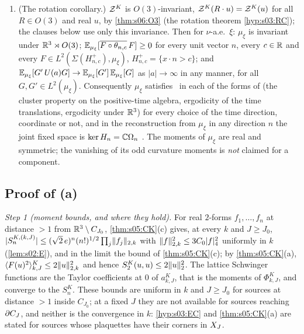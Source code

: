 \begin{theorem}
\begin{enumerate}[label=\textup{(\alph*)},leftmargin=*]
\item \textup{(The rotation corollary.)} $\mathcal Z^K$ is $O(3)$-invariant, $\mathcal Z^K(R\cdot u)=\mathcal Z^K(u)$ for all $R\in O(3)$ and real $u$, by \cref{thm:s06:O3} (the rotation theorem \cref{hyp:s03:RC}); the clauses below use only this invariance. Then for $\nu$-a.e.\ $\xi$: $\mu_\xi$ is invariant under $\mathbb R^3\rtimes O(3)$; $\mathbb E_{\mu_\xi}[\overline{F\circ\theta_{n,c}}\,F]\ge0$ for every unit vector $n$, every $c\in\mathbb R$ and every $F\in L^2(\Sigma(H^+_{n,c}),\mu_\xi)$, $H^+_{n,c}=\{x\cdot n>c\}$; and $\mathbb E_{\mu_\xi}[G'\,U(a)G]\to\mathbb E_{\mu_\xi}[G']\,\mathbb E_{\mu_\xi}[G]$ as $|a|\to\infty$ in any manner, for all $G,G'\in L^2(\mu_\xi)$. Consequently $\mu_\xi$ satisfies \OSf\ in each of the forms of \cite[Def.~2.11, Def.~2.12]{SymPhase} (the cluster property on the positive-time algebra, ergodicity of the time translations, ergodicity under $\mathbb R^3$) for every choice of the time direction, coordinate or not, and in the reconstruction from $\mu_\xi$ in any direction $n$ the joint fixed space is $\ker H_n=\mathbb C\Omega_n$ \cite[Cor.~10.44]{SymPhase}. The moments of $\mu_\xi$ are real and symmetric; the vanishing of its odd curvature moments is \emph{not} claimed for a component.
\end{enumerate}
\end{theorem}

\subsection{Proof of (a)}

\emph{Step 1 (moment bounds, and where they hold).} For real $2$-forms $f_1,\dots,f_n$ at distance $>1$ from $\mathbb R^3\setminus C_{J_0}$, \cref{thm:s05:CK}(c) gives, at every $k$ and $J\ge J_0$, $|S^{K,(k,J)}_n|\le(\sqrt2\,e)^n(n!)^{1/2}\prod_j\lVert f_j\rVert_{2,k}$ with $\lVert f\rVert_{2,k}^2\le3C_0\lvert f\rvert_{4}^2$ uniformly in $k$ (\cref{lem:s02:E}), and in the limit the bound of \cref{thm:s05:CK}(c); by \cref{thm:s05:CK}(a), $\langle F(u)^2\rangle^{K}_{k,J}\le2\lVert u\rVert^2_{2,k}$ and hence $S^K_2(u,u)\le2\lVert u\rVert_2^2$. The lattice Schwinger functions are the Taylor coefficients at $0$ of $a^K_{k,J}$, that is the moments of $\Phi^K_{k,J}$, and converge to the $S^K_n$. These bounds are uniform in $k$ and $J\ge J_0$ for sources at distance $>1$ inside $C_{J_0}$; at a fixed $J$ they are not available for sources reaching $\partial C_J$, and neither is the convergence in $k$: \cref{hyp:s03:EC} and \cref{thm:s05:CK}(a) are stated for sources whose plaquettes have their corners in $X_J$.

